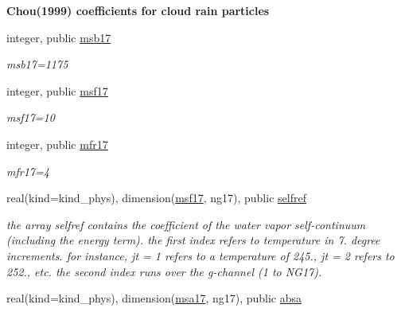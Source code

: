 \begin{Indent}\textbf{ Chou(1999) coefficients for cloud rain particles}\par
\begin{DoxyCompactItemize}
\item 
integer, public \hyperlink{group__module__radsw__kgbnn_gafbb056103147b8e5f4d5a8af40420ea0}{msb17}
\begin{DoxyCompactList}\small\item\em msb17=1175 \end{DoxyCompactList}\item 
integer, public \hyperlink{group__module__radsw__kgbnn_ga6864c3b95515fb2f408e21298da3952f}{msf17}
\begin{DoxyCompactList}\small\item\em msf17=10 \end{DoxyCompactList}\item 
integer, public \hyperlink{group__module__radsw__kgbnn_gadd099d7e1b5e7767d77de6d96673e26f}{mfr17}
\begin{DoxyCompactList}\small\item\em mfr17=4 \end{DoxyCompactList}\item 
real(kind=kind\+\_\+phys), dimension(\hyperlink{group__module__radsw__kgbnn_ga6864c3b95515fb2f408e21298da3952f}{msf17}, ng17), public \hyperlink{group__module__radsw__kgbnn_gaade34dfbe8c5f380088b6e03acc727c9}{selfref}
\begin{DoxyCompactList}\small\item\em the array selfref contains the coefficient of the water vapor self-\/continuum (including the energy term). the first index refers to temperature in 7. degree increments. for instance, jt = 1 refers to a temperature of 245., jt = 2 refers to 252., etc. the second index runs over the g-\/channel (1 to N\+G17). \end{DoxyCompactList}\item 
real(kind=kind\+\_\+phys), dimension(\hyperlink{namespacemodule__radsw__kgb17_ac139ff93555c22e658cb767fa7142e08}{msa17}, ng17), public \hyperlink{group__module__radsw__kgbnn_ga19083764c3dfe437282b032517baf3ed}{absa}

\end{DoxyCompactItemize}
\end{Indent}
